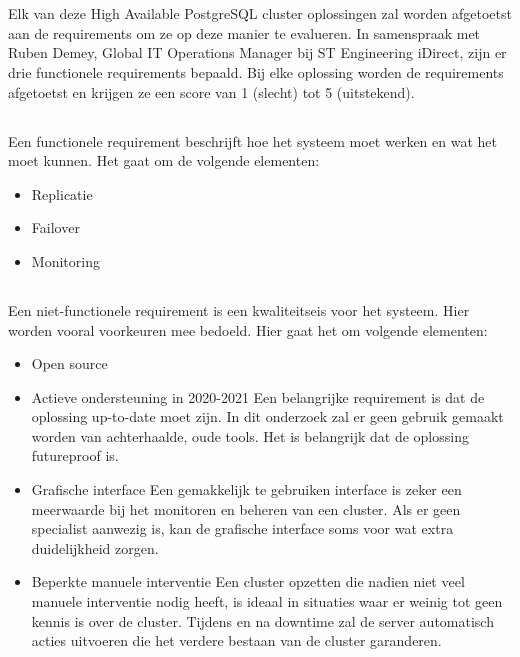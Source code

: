 \section{}
\label{sec:Requirementsanalyse}

Elk van deze High Available PostgreSQL cluster oplossingen zal worden afgetoetst aan de requirements om ze op deze manier te evalueren. In samenspraak met Ruben Demey, Global IT Operations Manager bij ST Engineering iDirect, zijn er drie functionele requirements bepaald. Bij elke oplossing worden de requirements afgetoetst en krijgen ze een score van 1 (slecht) tot 5 (uitstekend).


\subsection{}
\label{subsec:Functionele Requirements}
Een functionele requirement beschrijft hoe het systeem moet werken en wat het moet kunnen. Het gaat om de volgende elementen:

\begin{itemize}
    \item Replicatie
    \item Failover
    \item Monitoring
\end{itemize}


\subsection{}
\label{subsec:Niet-functionele Requirements}
Een niet-functionele requirement is een kwaliteitseis voor het systeem. Hier worden vooral voorkeuren mee bedoeld. Hier gaat het om volgende elementen:

\begin{itemize}
    \item Open source
    \item Actieve ondersteuning in 2020-2021
    \newline
    Een belangrijke requirement is dat de oplossing up-to-date moet zijn. In dit onderzoek zal er geen gebruik gemaakt worden van achterhaalde, oude tools. Het is belangrijk dat de oplossing futureproof is.
    \item Grafische interface
    \newline
    Een gemakkelijk te gebruiken interface is zeker een meerwaarde bij het monitoren en beheren van een cluster. Als er geen specialist aanwezig is, kan de grafische interface soms voor wat extra duidelijkheid zorgen.
    \item Beperkte manuele interventie
    \newline
    Een cluster opzetten die nadien niet veel manuele interventie nodig heeft, is ideaal in situaties waar er weinig tot geen kennis is over de cluster. Tijdens en na downtime zal de server automatisch acties uitvoeren die het verdere bestaan van de cluster garanderen.
    
\end{itemize}


